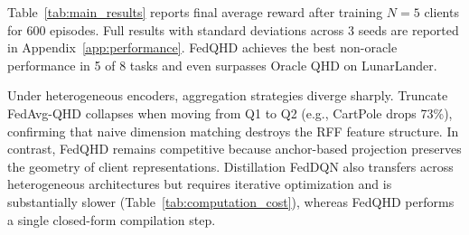 \documentclass[sigconf,anonymous]{aamas}
\theoremstyle{plain}
\theoremstyle{definition}
\theoremstyle{remark}
\begin{document}
Table~\ref{tab:main_results} reports final average reward after training
$N=5$ clients for 600 episodes. Full results with standard deviations across 3 seeds are reported in Appendix~\ref{app:performance}. FedQHD achieves the best non-oracle
performance in 5 of 8 tasks and even surpasses Oracle QHD on
LunarLander.


Under heterogeneous encoders, aggregation strategies diverge sharply.
Truncate FedAvg-QHD collapses when moving from Q1 to Q2 (e.g.,
CartPole drops 73\%), confirming that naive dimension matching
destroys the RFF feature structure. In contrast, FedQHD remains
competitive because anchor-based projection preserves the geometry
of client representations. Distillation FedDQN also transfers across
heterogeneous architectures but requires iterative optimization and
is substantially slower (Table~\ref{tab:computation_cost}), whereas
FedQHD performs a single closed-form compilation step.
\end{document}
